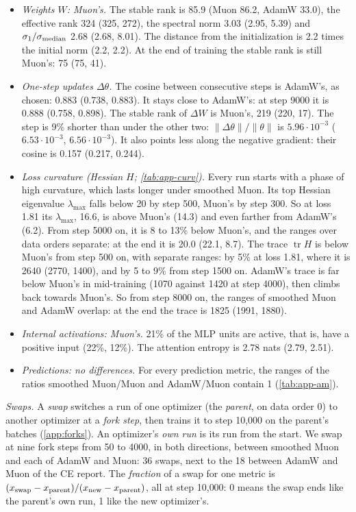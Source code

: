 \documentclass[10pt]{article}
\makeatletter
\renewcommand\paragraph{\@startsection{paragraph}{4}{\z@}{1.0ex \@plus .3ex \@minus .2ex}{-1em}{\normalfont\normalsize\bfseries}}
\makeatother
\begin{document}
\begin{itemize}
\item \emph{Weights $W$: Muon's.} The stable rank is 85.9 (Muon 86.2, AdamW 33.0), the effective rank 324 (325, 272),
the spectral norm 3.03 (2.95, 5.39) and $\sigma_1/\sigma_{\rm median}$ 2.68 (2.68, 8.01). The distance from the initialization
is 2.2 times the initial norm (2.2, 2.2). At the end of training the stable rank is still Muon's: 75 (75, 41).
\item \emph{One-step updates $\Delta\theta$.} The cosine between consecutive steps is AdamW's, as chosen: 0.883
(0.738, 0.883). It stays close to AdamW's: at step 9000 it is 0.888 (0.758, 0.898). The stable rank of $\Delta W$ is
Muon's, 219 (220, 17). The step is 9\% shorter than under the other two: $\|\Delta\theta\|/\|\theta\|$ is
$5.96\cdot10^{-3}$ ($6.53\cdot10^{-3}$, $6.56\cdot10^{-3}$). It also points less along the negative gradient: their
cosine is 0.157 (0.217, 0.244).
\item \emph{Loss curvature (Hessian $H$; \cref{tab:app-curv}).} Every run starts with a phase of high curvature, which
lasts longer under smoothed Muon. Its top Hessian eigenvalue $\lambda_{\max}$ falls below 20 by step 500, Muon's by
step 300. So at loss 1.81 its $\lambda_{\max}$, 16.6, is above Muon's (14.3) and even farther from AdamW's (6.2). From step 5000
on, it is 8 to 13\% below Muon's, and the ranges over data orders separate: at the end it is 20.0 (22.1, 8.7). The
trace $\operatorname{tr}H$ is below Muon's from step 500 on, with separate ranges: by 5\% at loss 1.81, where it is
2640 (2770, 1400), and by 5 to 9\% from step 1500 on. AdamW's trace is far below Muon's in mid-training (1070 against
1420 at step 4000), then climbs back towards Muon's. So from step 8000 on, the ranges of smoothed Muon and AdamW
overlap: at the end the trace is 1825 (1991, 1880).
\item \emph{Internal activations: Muon's.} 21\% of the MLP units are active, that is, have a positive input (22\%,
12\%). The attention entropy is 2.78 nats (2.79, 2.51).
\item \emph{Predictions: no differences.} For every prediction metric, the ranges of the ratios smoothed Muon/Muon
and AdamW/Muon contain 1 (\cref{tab:app-am}).
\end{itemize}

\paragraph{Step 3: swaps (\cref{fig:swap}).} \emph{Swaps.} A \emph{swap} switches a run of one optimizer (the
\emph{parent}, on data order 0) to another optimizer at a \emph{fork step}, then trains it to step 10{,}000 on the
parent's batches (\cref{app:forks}). An optimizer's \emph{own run} is its run from the start. We swap at nine fork steps
from 50 to 4000, in both directions, between smoothed Muon and each of AdamW and Muon: 36 swaps, next to the 18 between
AdamW and Muon of the CE report. The \emph{fraction} of a swap for one metric is
$(x_{\rm swap}-x_{\rm parent})/(x_{\rm new}-x_{\rm parent})$, all at step 10{,}000: 0 means the swap ends like the
parent's own run, 1 like the new optimizer's.
\end{document}
